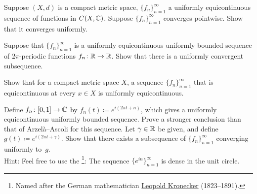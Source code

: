 \begin{exercise}
Suppose $(X,d)$ is a compact metric space, $\{ f_n \}_{n=1}^\infty$ a uniformly equicontinuous
sequence of functions in $C(X,{\mathbb{C}})$.  Suppose $\{ f_n \}_{n=1}^\infty$ converges
pointwise.  Show that it converges uniformly.
\end{exercise}

\begin{exercise}
Suppose that $\{ f_n \}_{n=1}^\infty$ is a uniformly equicontinuous uniformly bounded sequence of
$2\pi$-periodic functions $f_n \colon {\mathbb{R}} \to {\mathbb{R}}$.  Show that there is a
uniformly convergent subsequence.
\end{exercise}

\begin{exercise}
Show that for a compact metric space $X$,
a sequence $\{ f_n \}_{n=1}^\infty$ that is equicontinuous at every $x \in X$
is uniformly equicontinuous.
\end{exercise}

\begin{exercise}
Define $f_n \colon [0,1] \to {\mathbb{C}}$ by $f_n(t) \coloneqq e^{i(2\pi t + n)}$,
which gives a uniformly equicontinuous uniformly bounded sequence.
Prove a stronger conclusion than that of Arzel\`a--Ascoli for this sequence.
Let $\gamma \in {\mathbb{R}}$ be given,
and define $g(t) \coloneqq e^{i(2\pi t + \gamma)}$.  Show that there exists 
a subsequence of $\{ f_n \}_{n=1}^\infty$ converging uniformly to~$g$.
\\
Hint: Feel free to use the \emph{}\footnote{%
Named after the German mathematician
\href{https://en.wikipedia.org/wiki/Leopold_Kronecker}{Leopold Kronecker}
(1823--1891).}:
The sequence $\{ e^{in} \}_{n=1}^\infty$ is dense in the unit circle.
\end{exercise}

